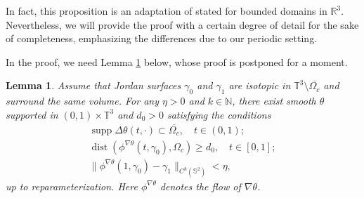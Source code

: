 \documentclass[11pt,a4paper]{article}
\numberwithin{equation}{section}
\newtheorem{lemma}[theorem]{Lemma}
\newcommand{\N}{\mathbb{N}}
\newcommand{\R}{\mathbb{R}}
\renewcommand{\S}{\mathbb{S}}
\newcommand{\T}{\mathbb{T}}
\newcommand{\opsupp}{\operatorname{supp}}
\newcommand{\opdist}{\operatorname{dist}}
\begin{document}
In fact, this proposition is an adaptation of \cite[Theorem 1.5]{GlaHor12} stated for bounded domains in $\R^3$. Nevertheless, we will provide the proof with a certain degree of detail for the sake of completeness, emphasizing the differences due to our periodic setting.


In the proof, we need Lemma \ref{lem.PotFlows.E} below, whose proof is postponed for a moment.


\begin{lemma}\label{lem.PotFlows.E}
Assume that Jordan surfaces $\gamma_0$ and $\gamma_1$ are isotopic in $\T^3\setminus\overline{\Omega_{c}}$ and surround the same volume. For any $\eta>0$ and $k\in\N$, there exist smooth $\theta$ supported in $(0,1)\times\T^3$ and $d_0>0$ satisfying the conditions 
\begin{gather}
    \opsupp \Delta \theta(t,\cdot) \subset \overline{\Omega_c}, \quad t\in(0,1); \label{item1.lem.PotFlows.E} \\
    \opdist(\phi^{\nabla\theta}(t,\gamma_0),\Omega_c)\geq d_0, \quad t\in[0,1]; \label{item2.lem.PotFlows.E} \\
    \|\phi^{\nabla\theta}(1,\gamma_0)-\gamma_1\|_{C^k(\S^2)}<\eta, \label{item3.lem.PotFlows.E}
\end{gather}
up to reparameterization. Here $\phi^{\nabla \theta}$ denotes the flow of $\nabla\theta$. 
\end{lemma}
\end{document}
